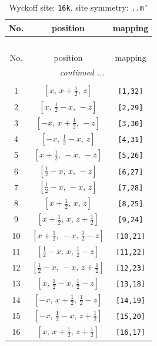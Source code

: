 \documentclass[fleqn,8pt]{jsarticle}
\begin{document}
\renewcommand{\arraystretch}{1.2}
\begin{longtable}{ccc}
\caption{Wyckoff site: {\tt 16k}, site symmetry: {\tt ..m'}}
 \\
 \hline \hline
No. & position & mapping \\ \hline \endfirsthead

\multicolumn{2}{l}{\tablename\ \thetable{}} \\
 \hline \hline
No. & position & mapping \\ \hline \endhead

 \hline \hline
\multicolumn{2}{r}{\footnotesize\it continued ...} \\ \endfoot

 \hline \hline
\multicolumn{2}{r}{} \\ \endlastfoot

1 & $\left[ x,\, x + \frac{1}{2},\, z \right]$ & {\tt [1,32]} \\ \hline
2 & $\left[ x,\, \frac{1}{2} - x,\, - z \right]$ & {\tt [2,29]} \\ \hline
3 & $\left[ - x,\, x + \frac{1}{2},\, - z \right]$ & {\tt [3,30]} \\ \hline
4 & $\left[ - x,\, \frac{1}{2} - x,\, z \right]$ & {\tt [4,31]} \\ \hline
5 & $\left[ x + \frac{1}{2},\, - x,\, - z \right]$ & {\tt [5,26]} \\ \hline
6 & $\left[ \frac{1}{2} - x,\, x,\, - z \right]$ & {\tt [6,27]} \\ \hline
7 & $\left[ \frac{1}{2} - x,\, - x,\, z \right]$ & {\tt [7,28]} \\ \hline
8 & $\left[ x + \frac{1}{2},\, x,\, z \right]$ & {\tt [8,25]} \\ \hline
9 & $\left[ x + \frac{1}{2},\, x,\, z + \frac{1}{2} \right]$ & {\tt [9,24]} \\ \hline
10 & $\left[ x + \frac{1}{2},\, - x,\, \frac{1}{2} - z \right]$ & {\tt [10,21]} \\ \hline
11 & $\left[ \frac{1}{2} - x,\, x,\, \frac{1}{2} - z \right]$ & {\tt [11,22]} \\ \hline
12 & $\left[ \frac{1}{2} - x,\, - x,\, z + \frac{1}{2} \right]$ & {\tt [12,23]} \\ \hline
13 & $\left[ x,\, \frac{1}{2} - x,\, \frac{1}{2} - z \right]$ & {\tt [13,18]} \\ \hline
14 & $\left[ - x,\, x + \frac{1}{2},\, \frac{1}{2} - z \right]$ & {\tt [14,19]} \\ \hline
15 & $\left[ - x,\, \frac{1}{2} - x,\, z + \frac{1}{2} \right]$ & {\tt [15,20]} \\ \hline
16 & $\left[ x,\, x + \frac{1}{2},\, z + \frac{1}{2} \right]$ & {\tt [16,17]} \\
\end{longtable}
\end{document}
